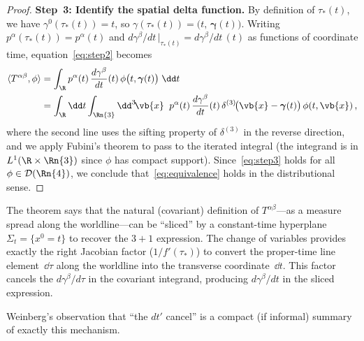 \begin{proof}
  \medskip\noindent
  \textbf{Step~3: Identify the spatial delta function.}\;
  By definition of $\tau_\ast(t)$, we have
  $\gamma^0(\tau_\ast(t)) = t$, so
  $\gamma(\tau_\ast(t)) = \bigl(t,\,\boldsymbol{\gamma}(t)\bigr)$.
  Writing $p^\alpha(\tau_\ast(t)) = p^\alpha(t)$ and
  $d\gamma^\beta/dt\,\big|_{\tau_\ast(t)} = d\gamma^\beta/dt\,(t)$
  as functions of coordinate time, equation~\eqref{eq:step2}
  becomes
  \begin{align}
    \langle T^{\alpha\beta},\phi\rangle
      &= \int_{\R} p^\alpha(t)\,
         \frac{d\gamma^\beta}{dt}(t)\,
         \phi\bigl(t,\boldsymbol{\gamma}(t)\bigr)\;\dd t
         \notag\\
      &= \int_{\R}\dd t\int_{\Rn{3}}\dd^3\!\vb{x}\;\;
         p^\alpha(t)\,\frac{d\gamma^\beta}{dt}(t)\,
         \delta^{(3)}\!\bigl(\vb{x} - \boldsymbol{\gamma}(t)\bigr)\,
         \phi(t,\vb{x})\,,
         \label{eq:step3}
  \end{align}
  where the second line uses the sifting property of
  $\delta^{(3)}$ in the reverse direction, and we apply Fubini's
  theorem to pass to the iterated integral (the integrand is
  in $L^1(\R\times\Rn{3})$ since $\phi$ has compact support).
  Since~\eqref{eq:step3} holds for all
  $\phi\in\mathcal{D}(\Rn{4})$, we conclude
  that~\eqref{eq:equivalence} holds in the distributional sense.
\end{proof}

\begin{intuition}
  The theorem says that the natural (covariant) definition of
  $T^{\alpha\beta}$---as a measure spread along the worldline---can
  be ``sliced'' by a constant-time hyperplane $\Sigma_t = \{x^0 = t\}$
  to recover the $3{+}1$ expression.  The change of variables provides
  exactly the right Jacobian factor ($1/f'(\tau_\ast)$) to convert
  the proper-time line element~$\dd\tau$ along the worldline into
  the transverse coordinate~$\dd t$.  This factor cancels the
  $d\gamma^\beta/d\tau$ in the covariant integrand, producing
  $d\gamma^\beta/dt$ in the sliced expression.

  Weinberg's observation that ``the $dt'$ cancel'' is a compact
  (if informal) summary of exactly this mechanism.
\end{intuition}
